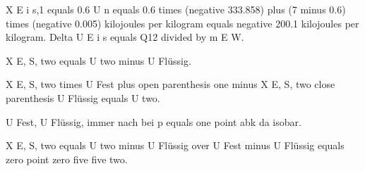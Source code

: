 X E i s,1 equals 0.6  
U n equals 0.6 times (negative 333.858) plus (7 minus 0.6) times (negative 0.005) kilojoules per kilogram  
equals negative 200.1 kilojoules per kilogram.  
Delta U E i s equals Q12 divided by m E W.

X E, S, two equals U two minus U Flüssig.

X E, S, two times U Fest plus open parenthesis one minus X E, S, two close parenthesis U Flüssig equals U two.

U Fest, U Flüssig, immer nach bei p equals one point abk da isobar.

X E, S, two equals U two minus U Flüssig over U Fest minus U Flüssig equals zero point zero five five two.